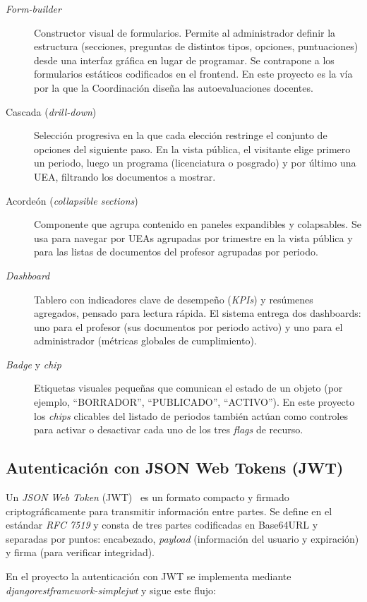 \begin{description}
    \item[\emph{Form-builder}] Constructor visual de formularios. Permite al administrador definir la estructura (secciones, preguntas de distintos tipos, opciones, puntuaciones) desde una interfaz gráfica en lugar de programar. Se contrapone a los formularios estáticos codificados en el frontend. En este proyecto es la vía por la que la Coordinación diseña las autoevaluaciones docentes.
    \item[Cascada (\emph{drill-down})] Selección progresiva en la que cada elección restringe el conjunto de opciones del siguiente paso. En la vista pública, el visitante elige primero un periodo, luego un programa (licenciatura o posgrado) y por último una UEA, filtrando los documentos a mostrar.
    \item[Acordeón (\emph{collapsible sections})] Componente que agrupa contenido en paneles expandibles y colapsables. Se usa para navegar por UEAs agrupadas por trimestre en la vista pública y para las listas de documentos del profesor agrupadas por periodo.
    \item[\emph{Dashboard}] Tablero con indicadores clave de desempeño (\emph{KPIs}) y resúmenes agregados, pensado para lectura rápida. El sistema entrega dos dashboards: uno para el profesor (sus documentos por periodo activo) y uno para el administrador (métricas globales de cumplimiento).
    \item[\emph{Badge} y \emph{chip}] Etiquetas visuales pequeñas que comunican el estado de un objeto (por ejemplo, ``BORRADOR'', ``PUBLICADO'', ``ACTIVO''). En este proyecto los \emph{chips} clicables del listado de periodos también actúan como controles para activar o desactivar cada uno de los tres \emph{flags} de recurso.
\end{description}

\subsection{Autenticación con JSON Web Tokens (JWT)}

Un \emph{JSON Web Token} (JWT)~\cite{jwt2015} es un formato compacto y firmado criptográficamente para transmitir información entre partes. Se define en el estándar \emph{RFC 7519} y consta de tres partes codificadas en Base64URL y separadas por puntos: encabezado, \emph{payload} (información del usuario y expiración) y firma (para verificar integridad).

En el proyecto la autenticación con JWT se implementa mediante \emph{djangorestframework-simplejwt} y sigue este flujo:

